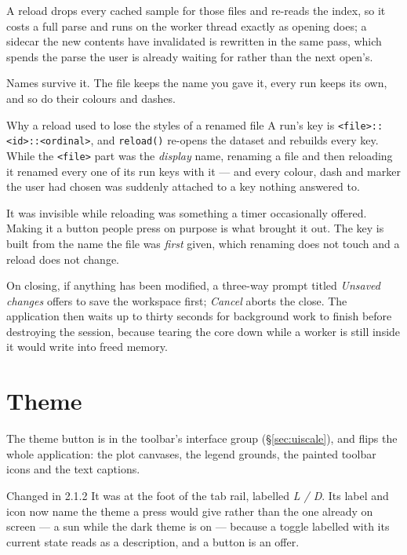 \documentclass[11pt,a4paper,oneside]{report}
\newcommand{\appver}{2.1.2}
\newcommand{\code}[1]{\texttt{#1}}
\begin{document}
A reload drops every cached sample for those files and re-reads the index, so
it costs a full parse and runs on the worker thread exactly as opening does; a
sidecar the new contents have invalidated is rewritten in the same pass, which
spends the parse the user is already waiting for rather than the next open's.

Names survive it. The file keeps the name you gave it, every run keeps its own,
and so do their colours and dashes.

\begin{aoenote}{Why a reload used to lose the styles of a renamed file}
A run's key is \code{<file>::<id>::<ordinal>}, and \code{reload()} re-opens the
dataset and rebuilds every key. While the \code{<file>} part was the
\emph{display} name, renaming a file and then reloading it renamed every one of
its run keys with it --- and every colour, dash and marker the user had chosen
was suddenly attached to a key nothing answered to.

It was invisible while reloading was something a timer occasionally offered.
Making it a button people press on purpose is what brought it out. The key is
built from the name the file was \emph{first} given, which renaming does not
touch and a reload does not change.
\end{aoenote}

On closing, if anything has been modified, a three-way prompt titled
\emph{Unsaved changes} offers to save the workspace first; \emph{Cancel} aborts
the close. The application then waits up to thirty seconds for background work
to finish before destroying the session, because tearing the core down while a
worker is still inside it would write into freed memory.

\section{Theme}
\label{sec:theme}

The theme button is in the toolbar's interface group (\S\ref{sec:uiscale}),
and flips the whole application: the plot canvases, the legend grounds, the
painted toolbar icons and the text captions.

\begin{aoenew}{Changed in \appver}
It was at the foot of the tab rail, labelled \emph{L / D}. Its label and icon
now name the theme a press would give rather than the one already on screen ---
a sun while the dark theme is on --- because a toggle labelled with its current
state reads as a description, and a button is an offer.
\end{aoenew}
\end{document}
